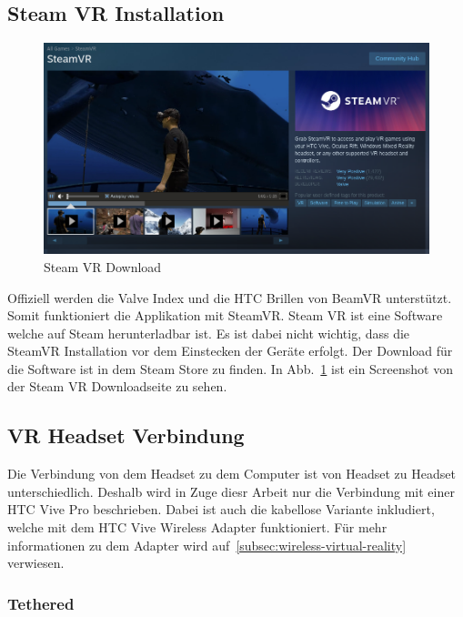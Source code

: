 \subsection{Steam VR Installation}

\begin{figure}
    \centering
    \includegraphics[scale=0.4]{pics/steam-vr-in-store}
    \caption{Steam VR Download}
    \label{fig:steam-vr-in-store}
\end{figure}

Offiziell werden die Valve Index und die HTC Brillen von BeamVR unterstützt.
Somit funktioniert die Applikation mit SteamVR.
Steam VR ist eine Software welche auf Steam herunterladbar ist.
Es ist dabei nicht wichtig, dass die SteamVR Installation vor dem Einstecken der Geräte erfolgt.
Der Download für die Software ist in dem Steam Store zu finden.
In Abb.~\ref{fig:steam-vr-in-store} ist ein Screenshot von der Steam VR Downloadseite zu sehen.

\subsection{VR Headset Verbindung}

Die Verbindung von dem Headset zu dem Computer ist von Headset zu Headset unterschiedlich.
Deshalb wird in Zuge diesr Arbeit nur die Verbindung mit einer HTC Vive Pro beschrieben.
Dabei ist auch die kabellose Variante inkludiert, welche mit dem HTC Vive Wireless Adapter funktioniert.
Für mehr informationen zu dem Adapter wird auf~\ref{subsec:wireless-virtual-reality} verwiesen.

\subsubsection{Tethered}

